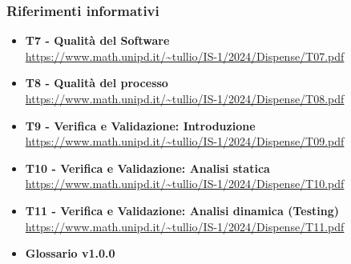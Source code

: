 \subsubsection{Riferimenti informativi}
\begin{itemize}
    \item \textbf{T7 - Qualità del Software} \\
    \url{https://www.math.unipd.it/~tullio/IS-1/2024/Dispense/T07.pdf}
    \item \textbf{T8 - Qualità del processo} \\
    \url{https://www.math.unipd.it/~tullio/IS-1/2024/Dispense/T08.pdf}
    \item \textbf{T9 - Verifica e Validazione: Introduzione} \\
    \url{ https://www.math.unipd.it/~tullio/IS-1/2024/Dispense/T09.pdf}
    \item \textbf{T10 - Verifica e Validazione: Analisi statica} \\
    \url{ https://www.math.unipd.it/~tullio/IS-1/2024/Dispense/T10.pdf}
    \item \textbf{T11 - Verifica e Validazione: Analisi dinamica (Testing)} \\
    \url{ https://www.math.unipd.it/~tullio/IS-1/2024/Dispense/T11.pdf}
    \item \textbf{Glossario v1.0.0} \\
    \end{itemize}